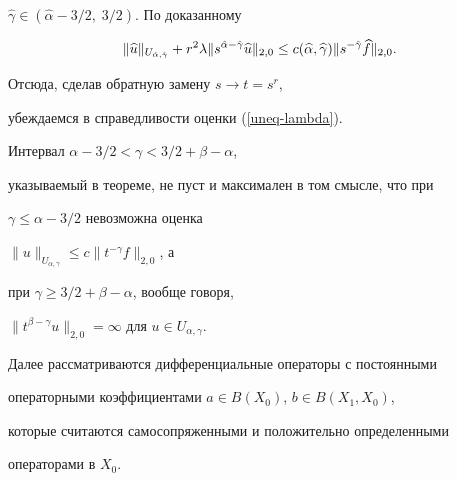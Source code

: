 \begin{pf}
$\widehat{\gamma} \in (\widehat{\alpha}-3/2,\;3/2)$. По доказанному


$$


\|\widehat{u}\|_{U_{\Hat{\alpha},\Hat{\gamma}}}


+r^2 \lambda\|s^{\Hat{\alpha}-\Hat{\gamma}}\widehat{u}\|_{2,0}\le


c(\widehat{\alpha},\widehat{\gamma})


\|s^{-\Hat{\gamma}}\widehat{f}\|_{2,0}.


$$


Отсюда, сделав обратную замену $s \to t=s^r$,


убеждаемся в справедливости оценки (\ref{uneq-lambda}).


\end{pf}





\begin{notenonum}


Интервал $\alpha-3/2<\gamma<3/2+\beta-\alpha$,


указываемый в теореме, не пуст и максимален в том смысле, что при


$\gamma \le \alpha-3/2$ невозможна оценка


$\|u\|_{U_{\alpha,\gamma}} \le c \|t^{-\gamma}f\|_{2,0}$, а


при $\gamma \ge 3/2+\beta-\alpha$, вообще говоря,


$\|t^{\beta-\gamma} u\|_{2,0} = \infty$ для $u \in U_{\alpha,\gamma}$.


\end{notenonum}





Далее рассматриваются дифференциальные операторы с постоянными


операторными коэффициентами $a \in B(X_0)$, $b \in B(X_1,X_0)$,


которые считаются самосопряженными и положительно определенными


операторами в $X_0$.





